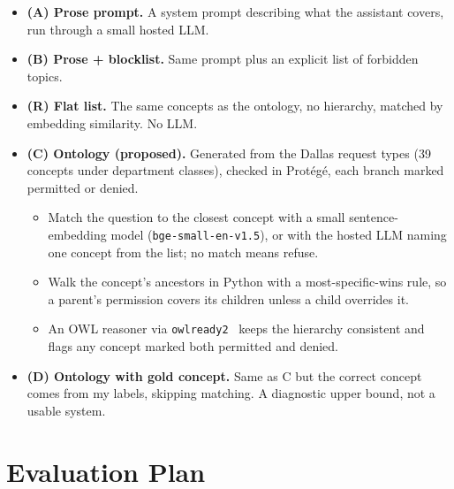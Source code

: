 \documentclass[conference]{IEEEtran}
\begin{document}
\begin{itemize}\setlength{\itemsep}{1pt}
  \item \textbf{(A) Prose prompt.} A system prompt describing what the assistant covers, run through a small hosted LLM.
  \item \textbf{(B) Prose + blocklist.} Same prompt plus an explicit list of forbidden topics.
  \item \textbf{(R) Flat list.} The same concepts as the ontology, no hierarchy, matched by embedding similarity. No LLM.
  \item \textbf{(C) Ontology (proposed).} Generated from the Dallas request types (39 concepts under department classes), checked in Prot\'eg\'e, each branch marked permitted or denied.
  \begin{itemize}\setlength{\itemsep}{0pt}
    \item Match the question to the closest concept with a small sentence-embedding model (\texttt{bge-small-en-v1.5}), or with the hosted LLM naming one concept from the list; no match means refuse.
    \item Walk the concept's ancestors in Python with a most-specific-wins rule, so a parent's permission covers its children unless a child overrides it.
    \item An OWL reasoner via \texttt{owlready2}~\cite{owlready} keeps the hierarchy consistent and flags any concept marked both permitted and denied.
  \end{itemize}
  \item \textbf{(D) Ontology with gold concept.} Same as C but the correct concept comes from my labels, skipping matching. A diagnostic upper bound, not a usable system.
\end{itemize}

\section{Evaluation Plan}
\end{document}
